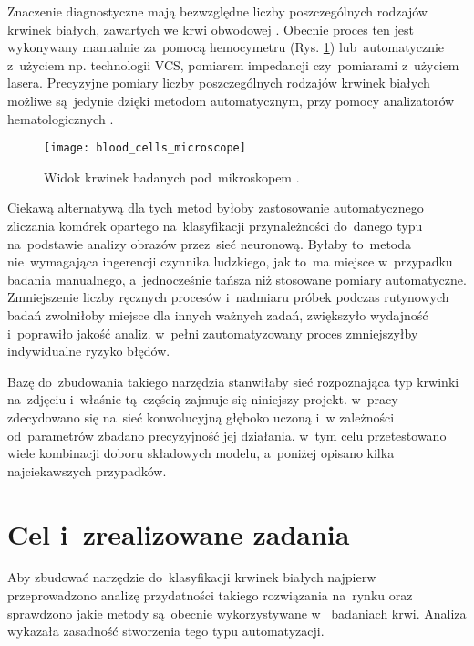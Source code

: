 {\parindent0pt %
Znaczenie diagnostyczne mają bezwzględne liczby poszczególnych rodzajów krwinek białych, zawartych we krwi obwodowej \cite{diagnostyka_laboratoryjna}. Obecnie proces ten jest wykonywany manualnie za~pomocą hemocymetru (Rys. \ref{blood_cells_microscope}) lub~automatycznie z~użyciem np. technologii VCS, pomiarem impedancji czy~pomiarami z~użyciem lasera. Precyzyjne pomiary liczby poszczególnych rodzajów krwinek białych możliwe są~jedynie dzięki metodom automatycznym, przy pomocy analizatorów hematologicznych \cite{diagnostyka_laboratoryjna}.

\begin{figure}[h]
	\centering
		\texttt{[image: blood\_cells\_microscope]}
	\caption{Widok krwinek badanych pod~mikroskopem \cite{cells_microscope}.}
	\label{blood_cells_microscope}
\end{figure}


Ciekawą alternatywą dla tych metod byłoby zastosowanie automatycznego zliczania komórek opartego na~klasyfikacji przynależności do~danego typu na~podstawie analizy obrazów przez~sieć neuronową. Byłaby to~metoda nie~wymagająca ingerencji czynnika ludzkiego, jak to~ma miejsce w~przypadku badania manualnego, a~jednocześnie tańsza niż stosowane pomiary automatyczne. Zmniejszenie liczby ręcznych procesów i~nadmiaru próbek podczas rutynowych badań zwolniłoby miejsce dla innych ważnych zadań, zwiększyło wydajność i~poprawiło jakość analiz. w~pełni zautomatyzowany proces zmniejszyłby indywidualne ryzyko błędów.

Bazę do~zbudowania takiego narzędzia stanwiłaby sieć rozpoznająca typ krwinki na~zdjęciu i~właśnie tą~częścią zajmuje się niniejszy projekt. w~pracy zdecydowano się na~sieć konwolucyjną głęboko uczoną i~w zależności od~parametrów zbadano precyzyjność jej działania. w~tym celu przetestowano wiele kombinacji doboru składowych modelu, a~poniżej opisano kilka najciekawszych przypadków.
}
\section{Cel i~zrealizowane zadania}
\label{sec:cel_i_zrealizowane_zadania}

Aby zbudować narzędzie do~klasyfikacji krwinek białych najpierw przeprowadzono analizę przydatności takiego rozwiązania na~rynku oraz sprawdzono jakie metody są~obecnie wykorzystywane w~ badaniach krwi. Analiza wykazała zasadność stworzenia tego typu automatyzacji.

